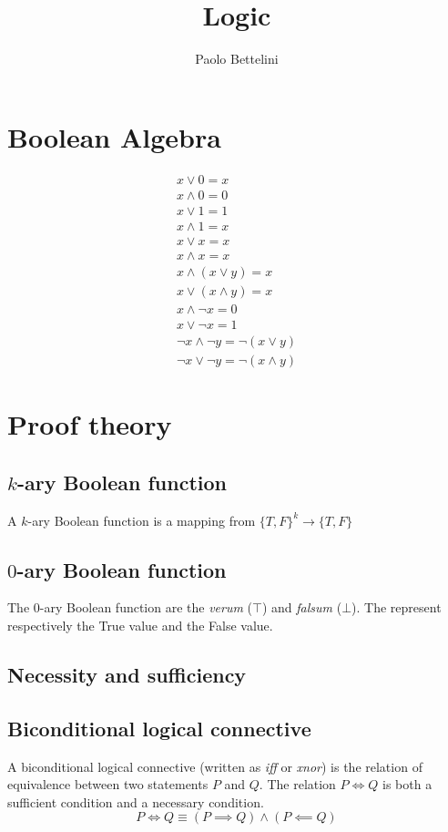\documentclass{article}
\title{Logic}
\author{Paolo Bettelini}
\date{}
\begin{document}
\maketitle
\tableofcontents
\pagebreak

\section{Boolean Algebra}


\begin{align*}
    x \lor 0 = x \\
    x \land 0 = 0 \\
    x \lor 1 = 1 \\
    x \land 1 = x \\
    x \lor x = x \\
    x \land x = x \\
    x \land (x \lor y) = x \\
    x \lor (x \land y) = x \\
    x \land \lnot x = 0 \\
    x \lor \lnot x = 1 \\
    \lnot x \land \lnot y = \lnot (x \lor y) \\
    \lnot x \lor \lnot y = \lnot (x \land y)
\end{align*}

\pagebreak

\section{Proof theory}

\subsection{\(k\)-ary Boolean function}

A \(k\)-ary Boolean function is a mapping from \({\{T, F\}}^k \to \{T,F\}\)

\subsection{\(0\)-ary Boolean function}

The \(0\)-ary Boolean function are the \textit{verum} (\(\top\)) and \textit{falsum} (\(\bot\)).
The represent respectively the True value and the False value.

\subsection{Necessity and sufficiency}

\subsection{Biconditional logical connective}

A biconditional logical connective (written as \textit{iff} or \textit{xnor})
is the relation of equivalence
between two statements \(P\) and \(Q\).
The relation \(P \iff Q\) is both a sufficient condition and
a necessary condition.
\[
    P \iff Q
    \equiv
    (P \implies Q) \land (P \impliedby Q)
\]
\end{document}
